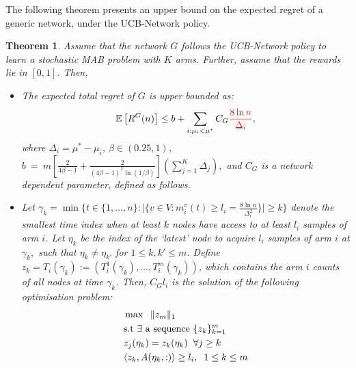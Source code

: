 \documentclass{article}
\newtheorem{theorem}{Theorem}
\begin{document}
The following theorem presents an upper bound on the expected regret of a generic network, under the UCB-Network policy.
\begin{theorem}
\label{Thm:3.1}
Assume that the network $G$ follows the UCB-Network policy to learn a stochastic MAB problem with $K$ arms. Further, assume that the rewards lie in $[0,1]$. Then,
\begin{itemize}
\item[(i)] The expected total regret of $G$ is upper bounded as:
\begin{equation*}
  \label{eq:3.1}
  \mathbb{E} \left[ R^G(n) \right] \leq b + \sum\limits_{i:\mu_i < \mu^*} C_G {\color{red}\frac{8 \ln n}{\Delta_i}},
\end{equation*}
where $\Delta_i = \mu^* - \mu_i$, $\beta \in (0.25,1)$, $b~=~m \left[ \frac{2}{4\beta -1} + \frac{2}{(4\beta-1)^2 \ln(1/\beta)} \right] \left( \sum\limits_{j=1}^K \Delta_j \right),$ and
$C_G$ is a network dependent parameter, defined as follows.
\item[(ii)] Let $\gamma_k = \min \lbrace t \in \lbrace 1, \dots, n \rbrace : \vert \lbrace v \in V : m^v_i(t) \geq l_i = \frac{8 \ln n}{\Delta_i^2} \rbrace \vert \geq k \rbrace$ denote the smallest time index when at least $k$ nodes have access to at least $l_i$ samples of arm $i$. Let $\eta_k$ be the index of the `latest' node to acquire  $l_i$ samples of arm $i$ at $\gamma_k,$ such that $\eta_k \neq \eta_{k'}$ for $1 \leq k, k' \leq m$. Define $z_k = T_i(\gamma_k) := \left( T^1_i(\gamma_k), \dots, T^m_i(\gamma_k) \right)$, which contains the arm $i$ counts of all nodes at time $\gamma_k$. Then, $C_G l_i$ is the solution of the following optimisation problem:
\begin{equation}
\label{OptimizationProblem11}
\begin{aligned}
& \max \hspace{2mm} \Vert z_m \Vert_1 \\
& \text{s.t $\exists$ a sequence $\lbrace z_k \rbrace_{k=1}^m$} \\
& z_j(\eta_k) = z_k(\eta_k) \hspace{2mm} \forall j \geq k\\
& \langle z_k, A(\eta_k,:) \rangle \geq l_i, \hspace{2mm} 1\leq k \leq m
\end{aligned}
\end{equation}
\end{itemize}
\end{theorem}
\end{document}
